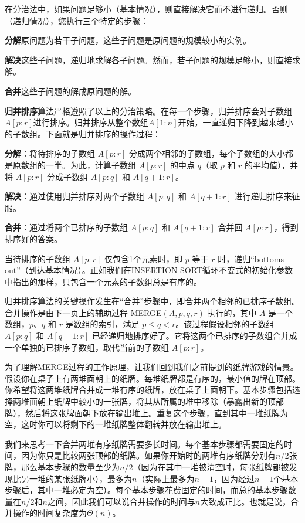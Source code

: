 \documentclass[lang=cn,newtx,10pt,scheme=chinese]{elegantbook}
\begin{document}
在分治法中，如果问题足够小（基本情况），则直接解决它而不进行递归。否则（递归情况），您执行三个特定的步骤：

\textbf{分解}原问题为若干子问题，这些子问题是原问题的规模较小的实例。

\textbf{解决}这些子问题，递归地求解各子问题。然而，若子问题的规模足够小，则直接求解。

\textbf{合并}这些子问题的解成原问题的解。

\textbf{归并排序}算法严格遵照了以上的分治策略。在每一个步骤，归并排序会对子数组$A[p:r]$进行排序。归并排序从整个数组$A[1:n]$开始，一直递归下降到越来越小的子数组。下面就是归并排序的操作过程：

\textbf{分解}：将待排序的子数组 $A[p:r]$ 分成两个相邻的子数组，每个子数组的大小都是原数组的一半。为此，计算子数组 $A[p:r]$ 的中点 $q$（取 $p$ 和 $r$ 的平均值），并将 $A[p:r]$ 分成子数组 $A[p:q]$ 和 $A[q+1:r]$。

\textbf{解决}：通过使用归并排序对两个子数组 $A[p:q]$ 和 $A[q+1:r]$ 进行递归排序来征服。

\textbf{合并}：通过将两个已排序的子数组 $A[p:q]$ 和 $A[q+1:r]$ 合并回 $A[p:r]$，得到排序好的答案。

当待排序的子数组 $A[p:r]$ 仅包含1个元素时，即 $p$ 等于 $r$ 时，递归“bottoms out”（到达基本情况）。正如我们在INSERTION-SORT循环不变式的初始化参数中指出的那样，只包含一个元素的子数组总是有序的。

归并排序算法的关键操作发生在“合并”步骤中，即合并两个相邻的已排序子数组。合并操作是由下一页上的辅助过程 MERGE$(A,p,q,r)$ 执行的，其中 $A$ 是一个数组，$p$、$q$ 和 $r$ 是数组的索引，满足 $p\le q < r$。该过程假设相邻的子数组 $A[p:q]$ 和 $A[q+1:r]$ 已经递归地排序好了。它将这两个已排序的子数组合并成一个单独的已排序子数组，取代当前的子数组 $A[p:r]$。

为了理解MERGE过程的工作原理，让我们回到我们之前提到的纸牌游戏的情景。假设你在桌子上有两堆面朝上的纸牌。每堆纸牌都是有序的，最小值的牌在顶部。你希望将这两堆纸牌合并成一堆有序的纸牌，放在桌子上面朝下。基本步骤包括选择两堆面朝上纸牌中较小的一张牌，将其从所属的堆中移除（暴露出新的顶部牌），然后将这张牌面朝下放在输出堆上。重复这个步骤，直到其中一堆纸牌为空，这时你可以将剩下的一堆纸牌整体翻转并放在输出堆上。

我们来思考一下合并两堆有序纸牌需要多长时间。每个基本步骤都需要固定的时间，因为你只是比较两张顶部的纸牌。如果你开始时的两堆有序纸牌分别有$n/2$张牌，那么基本步骤的数量至少为$n/2$（因为在其中一堆被清空时，每张纸牌都被发现比另一堆的某张纸牌小），最多为$n$（实际上最多为$n-1$，因为经过$n-1$个基本步骤后，其中一堆必定为空）。每个基本步骤花费固定的时间，而总的基本步骤数量在$n/2$和$n$之间，因此我们可以说合并操作的时间与$n$大致成正比。也就是说，合并操作的时间复杂度为$\Theta(n)$。
\end{document}
